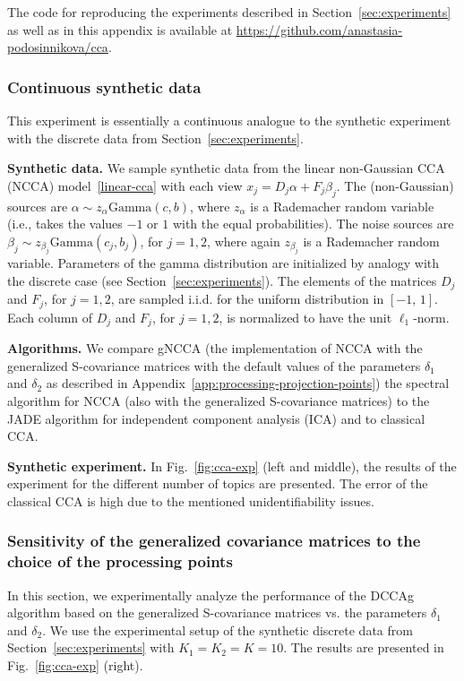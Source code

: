 \documentclass{article}
\newcommand{\ppp}{\textbf}
\newcommand{\gam}{\mathrm{Gamma}}
\begin{document}
The code for reproducing the experiments described in Section~\ref{sec:experiments} as well as in this appendix is available at \href{https://github.com/anastasia-podosinnikova/cca}{https://github.com/anastasia-podosinnikova/cca}.

\subsubsection{Continuous synthetic data}
\label{sec:exp-continuous}
This experiment is essentially a continuous analogue to the synthetic experiment with the discrete data from Section~\ref{sec:experiments}.

\ppp{Synthetic data.} We sample synthetic data from the linear non-Gaussian CCA (NCCA) model~\eqref{linear-cca} with each view $x_j = D_j \alpha + F_j \beta_j$. The (non-Gaussian) sources are $\alpha \sim z_{\alpha} \gam(c,b)$, where $z_{\alpha}$ is a Rademacher random variable (i.e., takes the values $-1$ or $1$ with the equal probabilities). The noise sources are $\beta_j \sim z_{\beta_j} \gam(c_j,b_j)$, for $j=1,2$,  where again $z_{\beta_j}$ is a Rademacher random variable. Parameters of the gamma distribution are initialized by analogy with the discrete case (see Section~\ref{sec:experiments}). The elements of the matrices $D_j$ and $F_j$, for $j=1,2$, are sampled i.i.d. for the uniform distribution in $[-1, \, 1]$. Each column of $D_j$ and $F_j$, for $j=1,2$, is normalized to have the unit $\ell_1$-norm.

\ppp{Algorithms.} We compare gNCCA (the implementation of NCCA with the generalized S-covariance matrices with the default values of the parameters $\delta_1$ and $\delta_2$ as described in Appendix~\ref{app:processing-projection-points}) the spectral algorithm for NCCA (also with the generalized S-covariance matrices) to the JADE algorithm 
\citep[the code is available at 
\href{http://perso.telecom-paristech.fr/~cardoso/Algo/Jade/jadeR.m}{http://perso.telecom-paristech.fr/~cardoso/Algo/Jade/jadeR.m;}][]{CarSou1993}
for independent component analysis (ICA) and to classical CCA.

\ppp{Synthetic experiment.} In Fig.~\ref{fig:cca-exp} (left and middle), the results of the experiment for the different number of topics are presented. The error of the classical CCA is high due to the mentioned unidentifiability issues.




\subsubsection{Sensitivity of the generalized covariance matrices to the choice of the processing points}
\label{app:gdcca-vs-delta}
In this section, we experimentally analyze the performance of the DCCAg algorithm based on the generalized S-covariance matrices vs. the parameters $\delta_1$ and $\delta_2$. We use the experimental setup of the synthetic discrete data from Section~\ref{sec:experiments} with $K_1=K_2=K=10$. The results are presented in Fig.~\ref{fig:cca-exp} (right).
\end{document}
